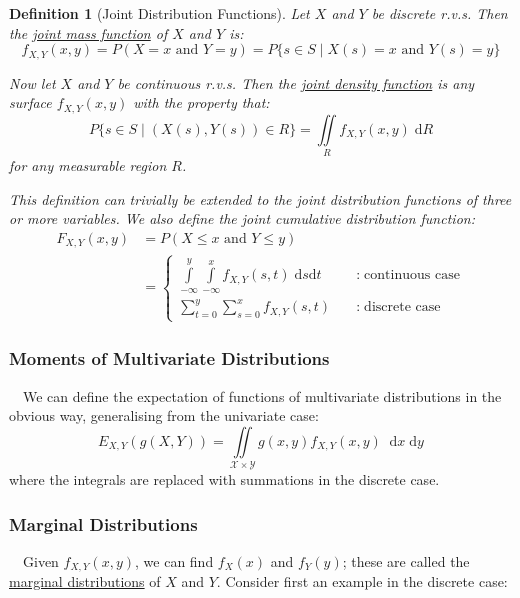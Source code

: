 \documentclass[12pt,a4paper]{article}
\newcommand{\diff}{\;\mathrm{d}}
\newtheorem{defn}[thm]{Definition}
\begin{document}
\begin{defn}[Joint Distribution Functions]
\vspace{1cm}

Let $X$ and $Y$ be discrete r.v.s. Then the \underline{joint mass function} of $X$ and $Y$ is:
$$f_{X,Y}(x,y) = P(X=x \text{ and } Y=y) = P\{s \in S \; | \; X(s) = x \text{ and } Y(s) = y\}$$

Now let $X$ and $Y$ be continuous r.v.s. Then the \underline{joint density function} is any surface $f_{X,Y}(x,y)$ with the property that:
$$P\{s \in S \; | \; (X(s),Y(s)) \in R\} = \iint\limits_R \! f_{X,Y}(x,y)\; \mathrm{d}R$$
for any measurable region $R$.\par
\vspace{1cm}

This definition can trivially be extended to the joint distribution functions of three or more variables. We also define the joint cumulative distribution function:
\begin{align*}
F_{X,Y}(x,y) &= P(X\leq x \text{ and } Y\leq y)\\
&= \left\{ \begin{array}{cl} \int\limits_{-\infty}^y\int\limits_{-\infty}^x\!\! f_{X,Y}(s,t)\;\mathrm{d}s\mathrm{d}t\quad & : \; \text{continuous case}\\ \sum\limits_{t=0}^y\sum\limits_{s=0}^x f_{X,Y}(s,t)\quad & : \; \text{discrete case} \end{array} \right.
\end{align*}

\end{defn}

\subsubsection{Moments of Multivariate Distributions}

$\quad$We can define the expectation of functions of multivariate distributions in the obvious way, generalising from the univariate case:
$$E_{X,Y}(g(X,Y)) = \iint\limits_{\mathcal{X}\times\mathcal{Y}}\!\! g(x,y)f_{X,Y}(x,y)\; \diff x\diff y$$
where the integrals are replaced with summations in the discrete case.

\subsubsection{Marginal Distributions}

$\quad$Given $f_{X,Y}(x,y)$, we can find $f_X(x)$ and $f_Y(y)$; these are called the \underline{marginal distributions} of $X$ and $Y$. Consider first an example in the discrete case:
\end{document}
